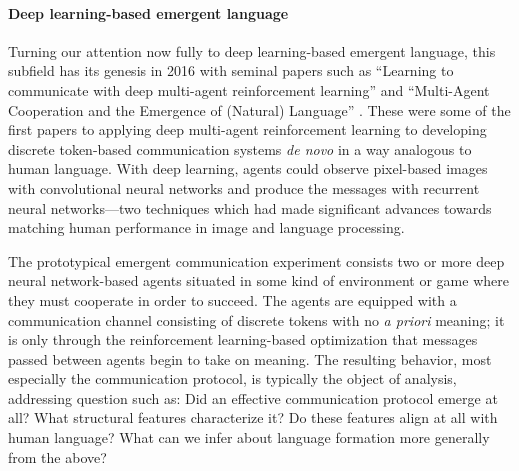 \paragraph{Deep learning-based emergent language}
Turning our attention now fully to deep learning-based emergent language,
  this subfield has its genesis in 2016 with seminal papers such as
  ``Learning to communicate with deep multi-agent reinforcement learning'' \citep{foerster2016learning}
  and ``Multi-Agent Cooperation and the Emergence of (Natural) Language'' \citep{lazaridou2016multiagent}.
These were some of the first papers to applying deep multi-agent reinforcement learning to developing discrete token-based communication systems \emph{de novo} in a way analogous to human language.
With deep learning, agents could observe pixel-based images with convolutional neural networks and produce the messages with recurrent neural networks---two techniques which had made significant advances towards matching human performance in image and language processing.

The prototypical emergent communication experiment consists two or more deep neural network-based agents situated in some kind of environment or game where they must cooperate in order to succeed.
The agents are equipped with a communication channel consisting of discrete tokens with no \emph{a priori} meaning; it is only through the reinforcement learning-based optimization that messages passed between agents begin to take on meaning.
The resulting behavior, most especially the communication protocol, is typically the object of analysis, addressing question such as:
  Did an effective communication protocol emerge at all?
  What structural features characterize it?
  Do these features align at all with human language?
  What can we infer about language formation more generally from the above?


